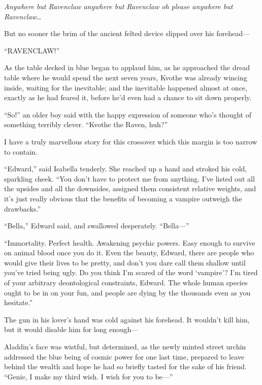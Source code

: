 \emph{Anywhere but Ravenclaw anywhere but Ravenclaw oh please anywhere but Ravenclaw…}

But no sooner the brim of the ancient felted device slipped over his forehead—

“RAVENCLAW!”

As the table decked in blue began to applaud him, as he approached the dread table where he would spend the next seven years, Kvothe was already wincing inside, waiting for the inevitable; and the inevitable happened almost at once, exactly as he had feared it, before he’d even had a chance to sit down properly.

“So!” an older boy said with the happy expression of someone who’s thought of something terribly clever. “Kvothe the Raven, huh?”


I have a truly marvellous story for this crossover which this margin is too narrow to contain.


“Edward,” said Isabella tenderly. She reached up a hand and stroked his cold, sparkling cheek. “You don’t have to protect me from anything. I’ve listed out all the upsides and all the downsides, assigned them consistent relative weights, and it’s just really obvious that the benefits of becoming a vampire outweigh the drawbacks.”

“Bella,” Edward said, and swallowed desperately. “Bella—”

“Immortality. Perfect health. Awakening psychic powers. Easy enough to survive on animal blood once you do it. Even the beauty, Edward, there are people who would give their lives to be pretty, and don’t you dare call them shallow until you’ve tried being ugly. Do you think I’m scared of the word ‘vampire’? I’m tired of your arbitrary deontological constraints, Edward. The whole human species ought to be in on your fun, and people are dying by the thousands even as you hesitate.”

The gun in his lover’s hand was cold against his forehead. It wouldn’t kill him, but it would disable him for long enough—


Aladdin’s face was wistful, but determined, as the newly minted street urchin addressed the blue being of cosmic power for one last time, prepared to leave behind the wealth and hope he had so briefly tasted for the sake of his friend. “Genie, I make my third wish. I wish for you to be—”

